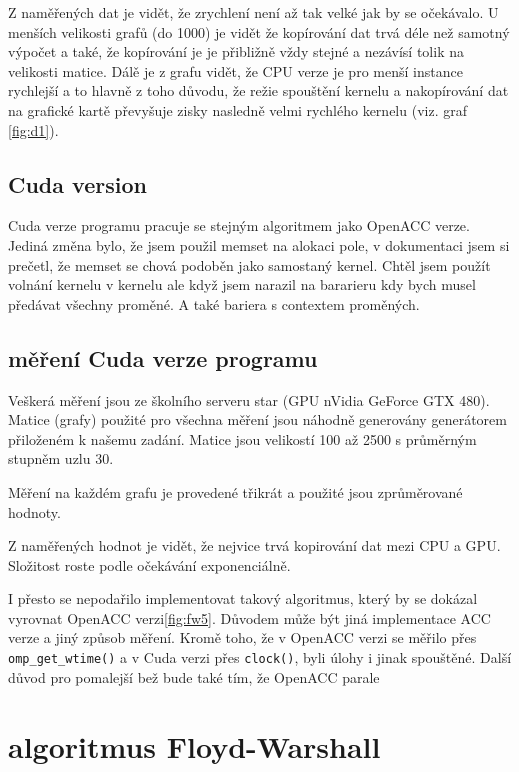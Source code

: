 \documentclass[11pt, fleqn]{article}
\begin{document}
Z naměřených dat je vidět, že zrychlení není až tak velké jak by se očekávalo. U menších velikosti grafů (do 1000) je vidět že kopírování dat trvá déle než samotný výpočet a také, že kopírování je je přibližně vždy stejné a nezávísí tolik na velikosti matice. Dálě je z grafu vidět, že CPU verze je pro menší instance rychlejší a to hlavně z toho důvodu, že režie spouštění kernelu a nakopírování dat na grafické kartě převyšuje zisky nasledně velmi rychlého kernelu (viz. graf \ref{fig:d1}).


\subsection{Cuda version}

Cuda verze programu pracuje se stejným algoritmem jako OpenACC verze. Jediná změna bylo, že jsem použil memset na alokaci pole, v dokumentaci jsem si prečetl, že memset se chová podoběn jako samostaný kernel. Chtěl jsem použít volnání kernelu v kernelu ale když jsem narazil na bararieru kdy bych musel předávat všechny proměné. A také bariera s contextem proměných.

\subsection{měření Cuda verze programu}

Veškerá měření jsou ze školního serveru star (GPU nVidia GeForce GTX 480). Matice (grafy) použité pro všechna měření jsou náhodně generovány generátorem přiloženém k našemu zadání. Matice jsou velikostí 100 až 2500 s průměrným stupněm uzlu 30.

Měření na každém grafu je provedené třikrát a použité jsou zprůměrované hodnoty.

Z naměřených hodnot je vidět, že nejvice trvá kopirování dat mezi CPU a GPU. Složitost roste podle očekávání exponenciálně.

I přesto se nepodařilo implementovat takový algoritmus, který by se dokázal vyrovnat OpenACC verzi\ref{fig:fw5}. Důvodem může být jiná implementace ACC verze a jiný způsob měření. Kromě toho, že v OpenACC verzi se měřilo přes \lstinline{omp_get_wtime()} a v Cuda verzi přes \lstinline{clock()}, byli úlohy i jinak spouštěné. Další důvod pro pomalejší bež bude také tím, že OpenACC parale

\section{algoritmus Floyd-Warshall}
\end{document}
